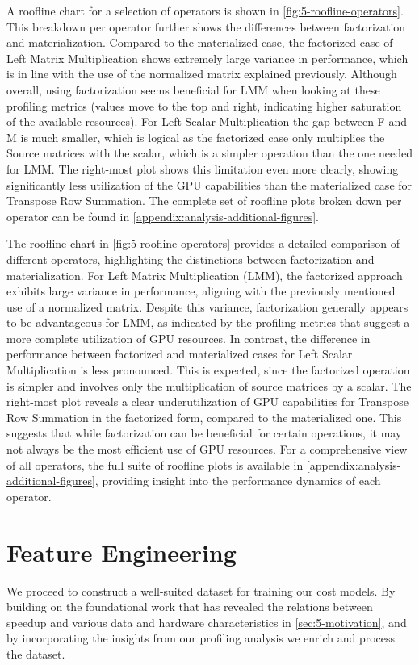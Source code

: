 A roofline chart for a selection of operators is shown in \autoref{fig:5-roofline-operators}. This breakdown per operator further shows the differences between factorization and materialization. Compared to the materialized case, the factorized case of Left Matrix Multiplication shows extremely large variance in performance, which is in line with the use of the normalized matrix explained previously. Although overall, using factorization seems beneficial for LMM when looking at these profiling metrics (values move to the top and right, indicating higher saturation of the available resources). For Left Scalar Multiplication the gap between F and M is much smaller, which is logical as the factorized case only multiplies the Source matrices with the scalar, which is a simpler operation than the one needed for LMM. The right-most plot shows this limitation even more clearly, showing significantly less utilization of the GPU capabilities than the materialized case for Transpose Row Summation. The complete set of roofline plots broken down per operator can be found in \autoref{appendix:analysis-additional-figures}.

The roofline chart in \autoref{fig:5-roofline-operators} provides a detailed comparison of different operators, highlighting the distinctions between factorization and materialization. For Left Matrix Multiplication (LMM), the factorized approach exhibits large variance in performance, aligning with the previously mentioned use of a normalized matrix. Despite this variance, factorization generally appears to be advantageous for LMM, as indicated by the profiling metrics that suggest a more complete utilization of GPU resources. In contrast, the difference in performance between factorized and materialized cases for Left Scalar Multiplication is less pronounced. This is expected, since the factorized operation is simpler and involves only the multiplication of source matrices by a scalar. The right-most plot reveals a clear underutilization of GPU capabilities for Transpose Row Summation in the factorized form, compared to the materialized one. This suggests that while factorization can be beneficial for certain operations, it may not always be the most efficient use of GPU resources. For a comprehensive view of all operators, the full suite of roofline plots is available in \autoref{appendix:analysis-additional-figures}, providing insight into the performance dynamics of each operator.

\section{Feature Engineering}
\label{sec:5-feature-engineering}
We proceed to construct a well-suited dataset for training our cost models. By building on the foundational work that has revealed the relations between speedup and various data and hardware characteristics in \autoref{sec:5-motivation}, and by incorporating the insights from our profiling analysis we enrich and process the dataset.

